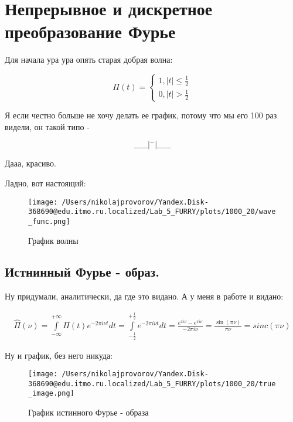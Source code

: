 \section{Непрерывное и дискретное преобразование Фурье}
Для начала ура ура опять старая добрая волна:

\begin{equation}
    \Pi(t) = 
    \begin{cases}
        1, |t| \leq \frac{1}{2} \\
        0, |t| > \frac{1}{2}
    \end{cases}
\end{equation}

Я если честно больше не хочу делать ее график, потому что мы его 100 раз видели, он такой типо - 

\begin{equation}
    \_\_\_\_\_|^{-}|\_\_\_\_\_
\end{equation}

Дааа, красиво.

Ладно, вот настоящий:

\begin{figure}[ht]
    \centering
    \texttt{[image: /Users/nikolajprovorov/Yandex.Disk-368690@edu.itmo.ru.localized/Lab\_5\_FURRY/plots/1000\_20/wave\_func.png]}
    \caption{График волны}
\end{figure}

\clearpage

\subsection{Истнинный Фурье - образ.}

Ну придумали, аналитически, да где это видано. А у меня в работе и видано:

\begin{align}
    \hat{\Pi}(\nu) = \int\limits_{-\infty}^{+\infty} \Pi(t) e^{-2\pi i\nu t} dt = \int\limits_{-\frac{1}{2}}^{+\frac{1}{2}} e^{-2\pi i\nu t} dt = \frac{e^{\pi i\nu} - e^{\pi i\nu}}{-2\pi i\nu} = \frac{\sin(\pi\nu)}{\pi\nu} = sinc(\pi \nu)
\end{align}

Ну и график, без него никуда:

\begin{figure}[ht]
    \centering
    \texttt{[image: /Users/nikolajprovorov/Yandex.Disk-368690@edu.itmo.ru.localized/Lab\_5\_FURRY/plots/1000\_20/true\_image.png]}
    \caption{График истинного Фурье - образа}
\end{figure}


